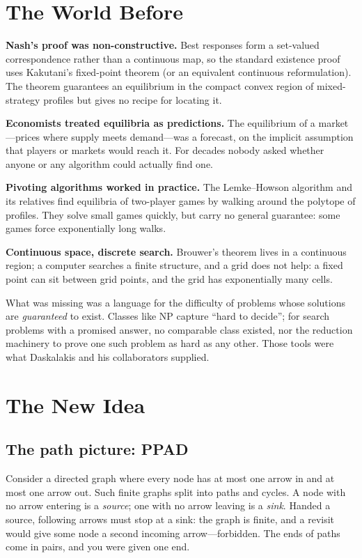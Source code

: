 \section{The World Before}

\noindent\textbf{Nash's proof was non-constructive.} Best responses form a set-valued correspondence rather than a continuous map, so the standard existence proof uses Kakutani's fixed-point theorem (or an equivalent continuous reformulation). The theorem guarantees an equilibrium in the compact convex region of mixed-strategy profiles but gives no recipe for locating it.

\noindent\textbf{Economists treated equilibria as predictions.} The equilibrium of a market---prices where supply meets demand---was a forecast, on the implicit assumption that players or markets would reach it. For decades nobody asked whether anyone or any algorithm could actually find one.

\noindent\textbf{Pivoting algorithms worked in practice.} The Lemke--Howson algorithm and its relatives find equilibria of two-player games by walking around the polytope of profiles. They solve small games quickly, but carry no general guarantee: some games force exponentially long walks.

\noindent\textbf{Continuous space, discrete search.} Brouwer's theorem lives in a continuous region; a computer searches a finite structure, and a grid does not help: a fixed point can sit between grid points, and the grid has exponentially many cells.

What was missing was a language for the difficulty of problems whose solutions are \emph{guaranteed} to exist. Classes like NP capture ``hard to decide''; for search problems with a promised answer, no comparable class existed, nor the reduction machinery to prove one such problem as hard as any other. Those tools were what Daskalakis and his collaborators supplied.

\section{The New Idea}
\subsection{The path picture: PPAD}

Consider a directed graph where every node has at most one arrow in and at most one arrow out. Such finite graphs split into paths and cycles. A node with no arrow entering is a \emph{source}; one with no arrow leaving is a \emph{sink}. Handed a source, following arrows must stop at a sink: the graph is finite, and a revisit would give some node a second incoming arrow---forbidden. The ends of paths come in pairs, and you were given one end.

